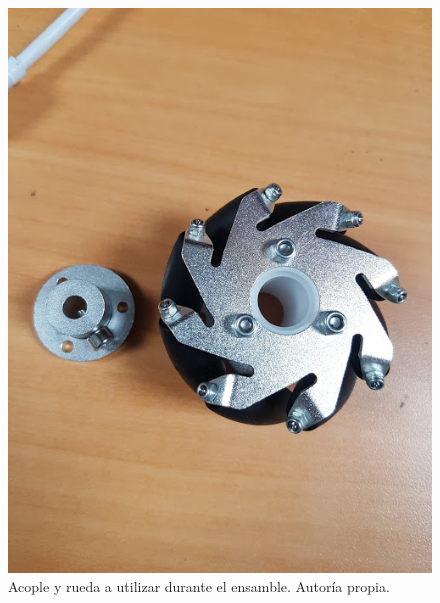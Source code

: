 \begin{figure}[H]
\centering
\includegraphics[scale=0.3]{imagenes/ruedas.jpg}
\caption{Acople y rueda a utilizar durante el ensamble. Autoría propia.}
\label{F:ruedas}
\end{figure}

